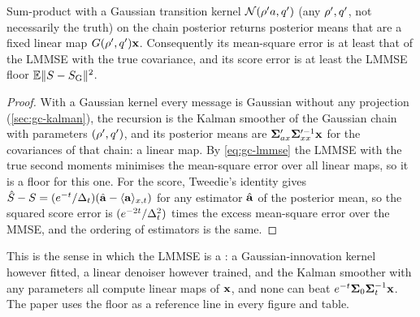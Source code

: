 \begin{corollary}
\label{cor:gc-linear}
Sum-product with a Gaussian transition kernel $\mathcal{N}\!\left(\rho' a,q'\right)$ (any
$\rho',q'$, not necessarily the truth) on the chain posterior returns posterior means
that are a fixed linear map $G(\rho',q')\mathbf{x}$. Consequently its mean-square error is at
least that of the LMMSE with the true covariance, and its score error is at least the
LMMSE floor $\mathbb{E}\lVert S-S_{\mathrm{G}}\rVert^2$.
\end{corollary}
\begin{proof}
With a Gaussian kernel every message is Gaussian without any projection
(\cref{sec:gc-kalman}), the recursion is the Kalman smoother of the Gaussian chain with
parameters $(\rho',q')$, and its posterior means are $\mathbf{\Sigma}'_{ax}\mathbf{\Sigma}'^{-1}_{xx}\mathbf{x}$ for
the covariances of that chain: a linear map. By \cref{eq:gc-lmmse} the LMMSE with the
true second moments minimises the mean-square error over all linear maps, so it is a
floor for this one. For the score, Tweedie's identity gives
$\hat{S}-S=(e^{-t}/\Delta_t)(\hat{\mathbf{a}}-\langle \mathbf{a} \rangle_{x,t})$ for any estimator $\hat{\mathbf{a}}$ of the
posterior mean, so the squared score error is $(e^{-2t}/\Delta_t^2)$ times the excess
mean-square error over the MMSE, and the ordering of estimators is the same.
\end{proof}

This is the sense in which the LMMSE is a : a Gaussian-innovation kernel however fitted, a linear denoiser however
trained, and the Kalman smoother with any parameters all compute linear maps of $\mathbf{x}$,
and none can beat $e^{-t}\mathbf{\Sigma}_0\mathbf{\Sigma}_t^{-1}\mathbf{x}$. The paper uses the floor as a reference
line in every figure and table.

